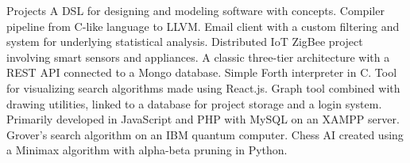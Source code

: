 \begin{rubric}{Projects}
\entry*[] A DSL for designing and modeling software with concepts.
\entry*[] Compiler pipeline from C-like language to LLVM.
\entry*[] Email client with a custom filtering and system for underlying statistical analysis.
\entry*[] Distributed IoT ZigBee project involving smart sensors and appliances. A classic three-tier architecture with a REST API connected to a Mongo database.
\entry*[] Simple Forth interpreter in C.
\entry*[] Tool for visualizing search algorithms made using React.js.
\entry*[] Graph tool combined with drawing utilities, linked to a database for project storage and a login system. Primarily developed in JavaScript and PHP with MySQL on an XAMPP server.
\entry*[] Grover's search algorithm on an IBM quantum computer.
\entry*[] Chess AI created using a Minimax algorithm with alpha-beta pruning in Python.
\end{rubric}